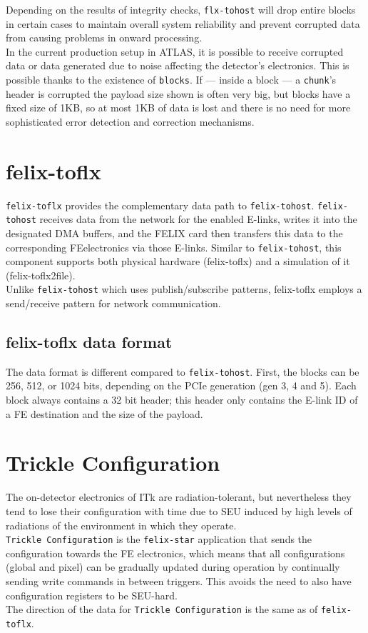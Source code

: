 Depending on the results of integrity checks, \texttt{flx-tohost} will drop entire blocks in certain cases to maintain overall system reliability and prevent corrupted data from causing problems in onward processing.\\
In the current production setup in \acs{ATLAS}, it is possible to receive corrupted data or data generated due to noise affecting the detector's electronics.
This is possible thanks to the existence of \texttt{blocks}. If --- inside a block --- a \texttt{chunk}'s header is corrupted the payload size shown is often very big, but blocks have a fixed size of 1KB, so at most 1KB of data is lost and there is no need for more sophisticated error detection and correction mechanisms.

\section{felix-toflx}
\label{sec:felix_toflx}
\texttt{felix-toflx} provides the complementary data path to \texttt{felix-tohost}. \texttt{felix-tohost} receives data from the network for the enabled \acs{E-link}s, writes it into the designated \acs{DMA} buffers, and the \acs{FELIX} card then transfers this data to the corresponding \acl{FE}electronics via those \acs{E-link}s.
Similar to \texttt{felix-tohost}, this component supports both physical hardware (felix-toflx) and a simulation of it (felix-toflx2file).\\
Unlike \texttt{felix-tohost} which uses publish/subscribe patterns, felix-toflx employs a send/receive pattern for network communication.

\subsection{felix-toflx data format}

The data format is different compared to \texttt{felix-tohost}. First, the blocks can be 256, 512, or 1024 bits, depending on the \acs{PCIe} generation (gen 3, 4 and 5). Each block always contains a 32 bit header; this header only contains the \acs{E-link} ID of a \acl{FE} destination and the size of the payload.

\section{Trickle Configuration}

The on-detector electronics of \acf{ITk} are radiation-tolerant, but nevertheless they tend to lose their configuration with time due to \acl{SEU} induced by high levels of radiations \cite{buschmann2019itk} of the environment in which they operate.\\
\texttt{Trickle Configuration} is the \texttt{felix-star} application that sends the configuration towards the \acl{FE} electronics, which means that all configurations (global and pixel) can be gradually updated during operation by continually sending write commands in between triggers. This avoids the need to also have configuration registers to be \acs{SEU}-hard.\\
The direction of the data for \texttt{Trickle Configuration} is the same as of \texttt{felix-toflx}.

